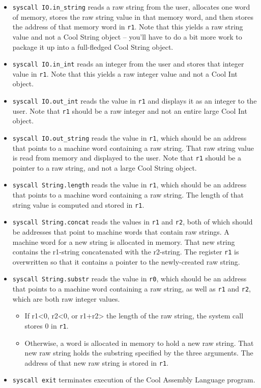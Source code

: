 \documentclass[]{article}
\begin{document}
\begin{itemize}
\itemsep1pt\parskip0pt
\item
  \texttt{syscall IO.in\_string} reads a raw string from the user,
  allocates one word of memory, stores the raw string value in that
  memory word, and then stores the address of that memory word in
  \texttt{r1}. Note that this yields a raw string value and not a Cool
  String object -- you'll have to do a bit more work to package it up
  into a full-fledged Cool String object.
\item
  \texttt{syscall IO.in\_int} reads an integer from the user and stores
  that integer value in \texttt{r1}. Note that this yields a raw integer
  value and not a Cool Int object.
\item
  \texttt{syscall IO.out\_int} reads the value in \texttt{r1} and
  displays it as an integer to the user. Note that \texttt{r1} should be
  a raw integer and not an entire large Cool Int object.
\item
  \texttt{syscall IO.out\_string} reads the value in \texttt{r1}, which
  should be an address that points to a machine word containing a raw
  string. That raw string value is read from memory and displayed to the
  user. Note that \texttt{r1} should be a pointer to a raw string, and
  not a large Cool String object.
\item
  \texttt{syscall String.length} reads the value in \texttt{r1}, which
  should be an address that points to a machine word containing a raw
  string. The length of that string value is computed and stored in
  \texttt{r1}.
\item
  \texttt{syscall String.concat} reads the values in \texttt{r1} and
  \texttt{r2}, both of which should be addresses that point to machine
  words that contain raw strings. A machine word for a new string is
  allocated in memory. That new string contains the r1-string
  concatenated with the r2-string. The register \texttt{r1} is
  overwritten so that it contains a pointer to the newly-created raw
  string.
\item
  \texttt{syscall String.substr} reads the value in \texttt{r0}, which
  should be an address that points to a machine word containing a raw
  string, as well as \texttt{r1} and \texttt{r2}, which are both raw
  integer values.

  \begin{itemize}
  \itemsep1pt\parskip0pt
  \item
    If r1\textless{}0, r2\textless{}0, or r1+r2\textgreater{} the length
    of the raw string, the system call stores 0 in \texttt{r1}.
  \item
    Otherwise, a word is allocated in memory to hold a new raw string.
    That new raw string holds the substring specified by the three
    arguments. The address of that new raw string is stored in
    \texttt{r1}.
  \end{itemize}
\item
  \texttt{syscall exit} terminates execution of the Cool Assembly
  Language program.
\end{itemize}
\end{document}
